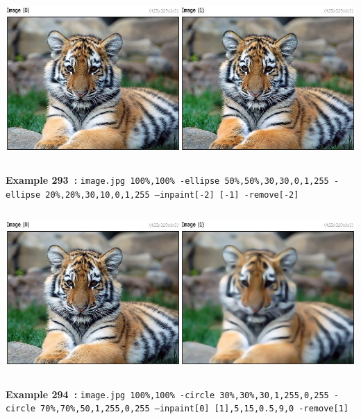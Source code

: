 \documentclass[a4paper,11pt,twoside]{book}
\begin{document}
\begin{center}\includegraphics[keepaspectratio=true,height=7cm,width=\textwidth]{img/gmic_def293.jpg}\\
{\footnotesize \textbf{Example 293~:} \texttt{image.jpg 100\%,100\% -ellipse 50\%,50\%,30,30,0,1,255 -ellipse 20\%,20\%,30,10,0,1,255 --inpaint[-2] [-1] -remove[-2]}}
\\\includegraphics[keepaspectratio=true,height=7cm,width=\textwidth]{img/gmic_def294.jpg}\\
{\footnotesize \textbf{Example 294~:} \texttt{image.jpg 100\%,100\% -circle 30\%,30\%,30,1,255,0,255 -circle 70\%,70\%,50,1,255,0,255 --inpaint[0] [1],5,15,0.5,9,0 -remove[1]}}
\end{center}
\end{document}
